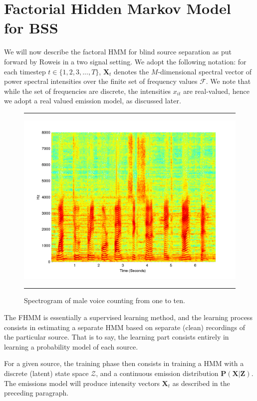\documentclass[11pt, oneside, a4paper]{report}
\begin{document}
\section{Factorial Hidden Markov Model for BSS}\label{fhmm}

We will now describe the factoral HMM for blind source separation as
put forward by Roweis in a two signal setting. We adopt the following
notation: for each timestep $t \in \{1,2,3,...,T\}$, $\mathbf{X}_t$
denotes the $M$-dimensional spectral vector of power spectral
intensities over the finite set of frequency values $\mathcal{F}$. We
note that while the set of frequencies are discrete, the intensities
$x_{it}$ are real-valued, hence we adopt a real valued emission
model, as discussed later. 


\begin{figure}
  \centering
  \hrule
  \includegraphics[width = .9\textwidth]{Figures/spectrogram_count}
  \hrule
  \caption{Spectrogram of male voice counting from one to ten.}
\end{figure}


The FHMM is essentially a supervised learning method, and the learning
process consists in estimating a separate HMM based on separate (clean) recordings of the
particular source. That is to say, the learning part consists entirely
in learning a probability model of each source. 

For a given source, the training phase then consists in
training a HMM with a discrete (latent) state space $\mathcal{Z}$, and
a continuous emission distribution $\mathbf{P(X|Z)}$. The emissions
model will produce intensity vectors $\mathbf{X}_t$ as described in
the preceding paragraph.
\end{document}
